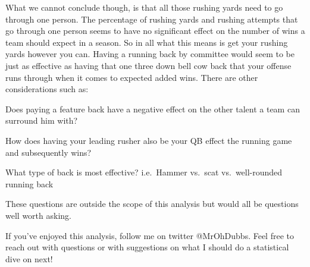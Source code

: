 \documentclass[]{article}
\begin{document}
What we cannot conclude though, is that all those rushing yards need to
go through one person. The percentage of rushing yards and rushing
attempts that go through one person seems to have no significant effect
on the number of wins a team should expect in a season. So in all what
this means is get your rushing yards however you can. Having a running
back by committee would seem to be just as effective as having that one
three down bell cow back that your offense runs through when it comes to
expected added wins. There are other considerations such as:

Does paying a feature back have a negative effect on the other talent a
team can surround him with?

How does having your leading rusher also be your QB effect the running
game and subsequently wins?

What type of back is most effective? i.e.~Hammer vs.~scat
vs.~well-rounded running back

These questions are outside the scope of this analysis but would all be
questions well worth asking.

If you've enjoyed this analysis, follow me on twitter @MrOhDubbs. Feel
free to reach out with questions or with suggestions on what I should do
a statistical dive on next!
\end{document}
